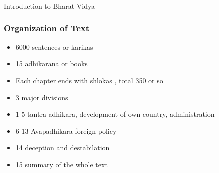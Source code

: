\begin{frame}[fragile]\frametitle{}
\begin{center}
{\Large Introduction to Bharat Vidya}
\end{center}
\end{frame}

\begin{frame}[fragile]\frametitle{Organization of Text}
	\begin{itemize}
	\item 6000 sentences or karikas
	\item 15 adhikarana or books
	\item Each chapter ends with shlokas , total 350 or so
	\item 3 major divisions
	\item 1-5 tantra adhikara, development of own country, administration 
	\item 6-13 Avapadhikara foreign policy 
	\item 14 deception and destabilation 
	\item 15 summary of the whole text
	\end{itemize}

\end{frame}
